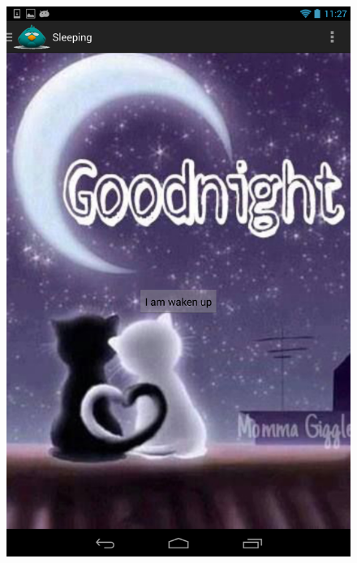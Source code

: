 \documentclass[14pt]{extreport}
\begin{document}
\begin{figure}[h]
\begin{center}
\includegraphics[width=5in]{sleep}
\end{center}
\end{figure}
\end{document}
